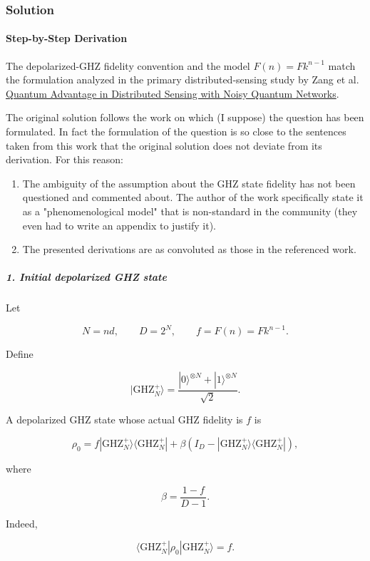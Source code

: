 \subsubsection*{Solution}
\paragraph*{Step-by-Step Derivation}

The depolarized-GHZ fidelity convention and the model $F(n)=Fk^{n-1}$ match the formulation analyzed in the primary distributed-sensing study by Zang et al. \href{\detokenize{https://arxiv.org/abs/2409.17089}}{Quantum Advantage in Distributed Sensing with Noisy Quantum Networks}.

{\color{blue}

The original solution follows the work on which (I suppose) the question has been formulated. In fact the formulation of the question is so close to the sentences taken from this work that the original solution does not deviate from its derivation. For this reason:
\begin{enumerate}
  \item The ambiguity of the assumption about the GHZ state fidelity has not been questioned and commented about. The author of the work specifically state it as a "phenomenological model" that is non-standard in the community (they even had to write an appendix to justify it).
  \item The presented derivations are as convoluted as those in the referenced work.
\end{enumerate}

}

\subparagraph*{1. Initial depolarized GHZ state}

Let

\[
N=nd,\qquad D=2^N,\qquad f=F(n)=Fk^{n-1}.
\]

Define

\[
|\mathrm{GHZ}_N^{+}\rangle = \frac{|0\rangle^{\otimes N}+|1\rangle^{\otimes N}}{\sqrt2}.
\]

A depolarized GHZ state whose actual GHZ fidelity is $f$ is

\[
\rho_0 = f|\mathrm{GHZ}_N^{+}\rangle\langle\mathrm{GHZ}_N^{+}| + \beta\left( I_D- |\mathrm{GHZ}_N^{+}\rangle\langle\mathrm{GHZ}_N^{+}| \right),
\]

where

\[
\beta=\frac{1-f}{D-1}.
\]

Indeed,

\[
\langle\mathrm{GHZ}_N^{+}|\rho_0|\mathrm{GHZ}_N^{+}\rangle=f.
\]

